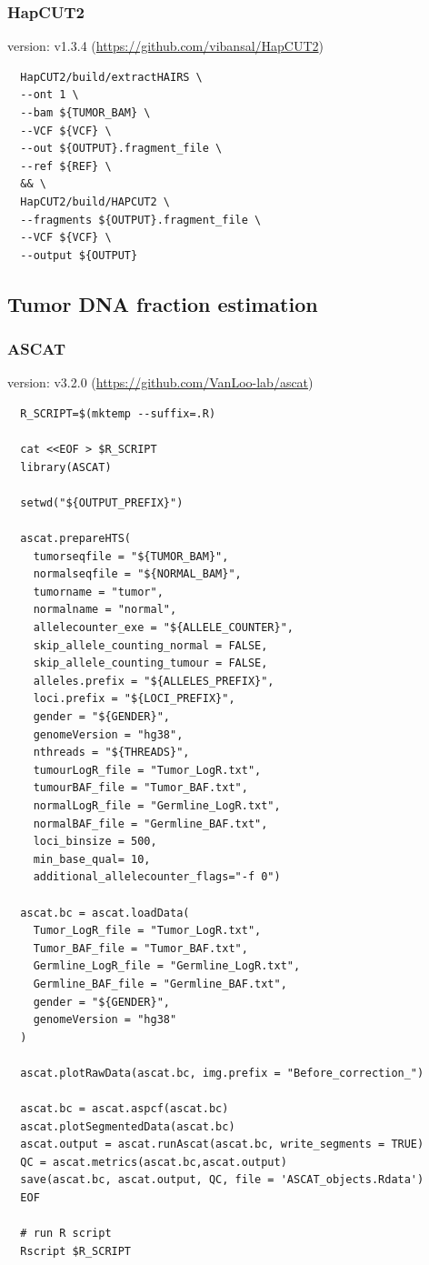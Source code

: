 \documentclass[pdflatex,sn-nature]{sn-jnl}
\begin{document}
\subsubsection{HapCUT2}
version: v1.3.4 (\url{https://github.com/vibansal/HapCUT2})
\label{supp:hapcut2}
\begin{verbatim}
  HapCUT2/build/extractHAIRS \
  --ont 1 \
  --bam ${TUMOR_BAM} \
  --VCF ${VCF} \
  --out ${OUTPUT}.fragment_file \
  --ref ${REF} \
  && \
  HapCUT2/build/HAPCUT2 \
  --fragments ${OUTPUT}.fragment_file \
  --VCF ${VCF} \
  --output ${OUTPUT}
\end{verbatim}

\subsection{Tumor DNA fraction estimation}
\subsubsection{ASCAT}
version: v3.2.0 (\url{https://github.com/VanLoo-lab/ascat})
\label{supp:ascat}
\begin{verbatim}
  R_SCRIPT=$(mktemp --suffix=.R)

  cat <<EOF > $R_SCRIPT
  library(ASCAT)

  setwd("${OUTPUT_PREFIX}")

  ascat.prepareHTS(
    tumorseqfile = "${TUMOR_BAM}",
    normalseqfile = "${NORMAL_BAM}",
    tumorname = "tumor",
    normalname = "normal",
    allelecounter_exe = "${ALLELE_COUNTER}",
    skip_allele_counting_normal = FALSE,
    skip_allele_counting_tumour = FALSE,
    alleles.prefix = "${ALLELES_PREFIX}",
    loci.prefix = "${LOCI_PREFIX}",
    gender = "${GENDER}",
    genomeVersion = "hg38",
    nthreads = "${THREADS}",
    tumourLogR_file = "Tumor_LogR.txt",
    tumourBAF_file = "Tumor_BAF.txt",
    normalLogR_file = "Germline_LogR.txt",
    normalBAF_file = "Germline_BAF.txt",
    loci_binsize = 500,
    min_base_qual= 10,
    additional_allelecounter_flags="-f 0")

  ascat.bc = ascat.loadData(
    Tumor_LogR_file = "Tumor_LogR.txt",
    Tumor_BAF_file = "Tumor_BAF.txt",
    Germline_LogR_file = "Germline_LogR.txt",
    Germline_BAF_file = "Germline_BAF.txt",
    gender = "${GENDER}",
    genomeVersion = "hg38"
  )

  ascat.plotRawData(ascat.bc, img.prefix = "Before_correction_")

  ascat.bc = ascat.aspcf(ascat.bc)
  ascat.plotSegmentedData(ascat.bc)
  ascat.output = ascat.runAscat(ascat.bc, write_segments = TRUE)
  QC = ascat.metrics(ascat.bc,ascat.output)
  save(ascat.bc, ascat.output, QC, file = 'ASCAT_objects.Rdata')
  EOF

  # run R script
  Rscript $R_SCRIPT
\end{verbatim}
\end{document}
